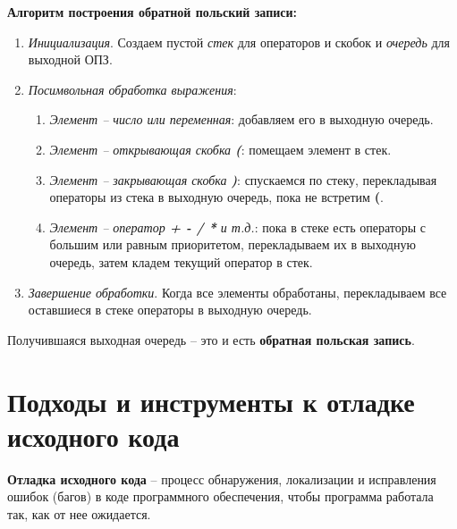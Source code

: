 \textbf{Алгоритм построения обратной польский записи:}
\begin{enumerate}[font=\footnotesize, noitemsep, topsep=0pt, , partopsep=0pt]
	\item {\footnotesize \textit{Инициализация}. Создаем пустой \textit{стек} для операторов и скобок и \textit{очередь} для выходной ОПЗ.}
	\item {\footnotesize \textit{Посимвольная обработка выражения}:}
	\begin{enumerate}[font=\footnotesize, noitemsep, topsep=0pt, , partopsep=0pt]
		\item {\footnotesize \textit{Элемент -- число или переменная}: добавляем его в выходную очередь.}
		\item {\footnotesize \textit{Элемент -- открывающая скобка \textbf{(}}: помещаем элемент в стек.}
		\item {\footnotesize \textit{Элемент -- закрывающая скобка \textbf{)}}: спускаемся по стеку, перекладывая операторы из стека в выходную очередь, пока не встретим \textbf{(}.}
		\item {\footnotesize \textit{Элемент -- оператор \textbf{+ - / *} и т.д.}: пока в стеке есть операторы с большим или равным приоритетом, перекладываем их в выходную очередь, затем кладем текущий оператор в стек.}
	\end{enumerate}
	\item {\footnotesize \textit{Завершение обработки}. Когда все элементы обработаны, перекладываем все оставшиеся в стеке операторы в выходную очередь.}
\end{enumerate}
Получившаяся выходная очередь -- это и есть \textbf{обратная польская запись}.
\vspace{50pt}



\section{Подходы и инструменты к отладке исходного кода}

\textbf{Отладка исходного кода} -- процесс обнаружения, локализации и исправления ошибок (багов) в коде программного обеспечения, чтобы программа работала так, как от нее ожидается.
\vspace{5pt}

